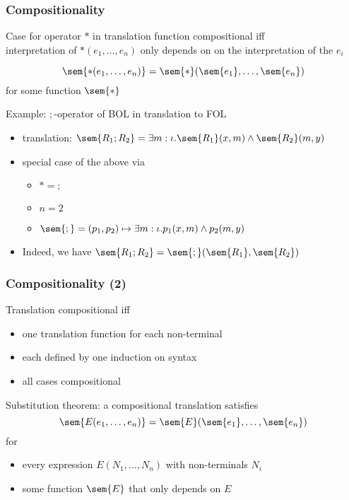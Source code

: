 \begin{frame}\frametitle{Compositionality}
Case for operator $*$ in translation function compositional iff \\
interpretation of $*(e_1,\ldots,e_n)$ only depends on on the interpretation of the $e_i$

\[\sem{*(e_1,\ldots,e_n)}=\sem{*}(\sem{e_1},\ldots,\sem{e_n})\]
for some function $\sem{*}$
\bigskip

Example: $;$-operator of BOL in translation to FOL
\begin{itemize}
 \item translation: $\sem{R_1 ; R_2}= \exists m:\iota.\sem{R_1}(x,m)\wedge \sem{R_2}(m,y)$
 \item special case of the above via
  \begin{itemize}
  \item $*=;$
  \item $n=2$
  \item $\sem{;}=(p_1,p_2)\mapsto \exists m:\iota.p_1(x,m)\wedge p_2(m,y)$
  \end{itemize}
 \item Indeed, we have $\sem{R_1;R_2}=\sem{;}(\sem{R_1},\sem{R_2})$
\end{itemize}
\end{frame}


\begin{frame}\frametitle{Compositionality (2)}
Translation compositional iff
\begin{itemize}
\item one translation function for each non-terminal
\item each defined by one induction on syntax
\item all cases compositional
\end{itemize}
\bigskip

Substitution theorem: a compositional translation satisfies
\[\sem{E(e_1,\ldots,e_n)}=\sem{E}(\sem{e_1},\ldots,\sem{e_n})\]
for
\begin{itemize}
\item every expression $E(N_1,\ldots,N_n)$ with non-terminals $N_i$
\item some function $\sem{E}$ that only depends on $E$
\end{itemize}
\end{frame}


